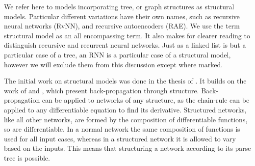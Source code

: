 \documentclass[12pt,parskip]{komatufte}
\begin{document}
We refer here to models incorporating tree, or graph structures as structural models.
Particular different variations have their own names, such as recursive neural networks (RvNN), and recursive autoencoders (RAE).
We use the term structural model as an all encompassing term. 
It also makes for clearer reading to distinguish recursive and recurrent  neural networks.
Just as a linked list is but a particular case of a tree, an RNN is a particular case of a structural model,
however we will exclude them from this discussion except where marked.


The initial work on structural models was done in the thesis of .
It builds on the work of  and , which present back-propagation through structure.
Back-propagation can be applied to networks of any structure, 
as the chain-rule can be applied to any differentiable equation to find its derivative.
Structured networks, like all other networks, are formed by the composition of differentiable functions, so are differentiable.
In a normal network the same composition of functions is used for all input cases,
whereas in a structured network it is allowed to vary based on the inputs.
This means that structuring a network according to its parse tree is possible.

\end{document}
